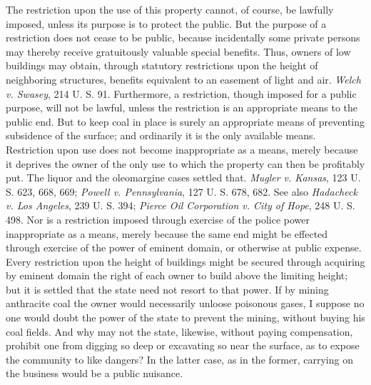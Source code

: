 The restriction upon the use of this property cannot, of course, be lawfully
imposed, unless its purpose is to protect the public. But the purpose of a
restriction does not cease to be public, because incidentally some private
persons may thereby receive gratuitously valuable special benefits. Thus, owners
of low buildings may obtain, through statutory restrictions upon the height of
neighboring structures, benefits equivalent to an easement of light and air.
\emph{Welch v. Swasey}, 214 U. S. 91. Furthermore, a restriction, though imposed
for a public purpose, will not be lawful, unless the restriction is an
appropriate means to the public end. But to keep coal in place is surely an
appropriate means of preventing subsidence of the surface; and ordinarily it is
the only available means. Restriction upon use does not become inappropriate as
a means, merely because it deprives the owner of the only use to which the
property can then be profitably put. The liquor and the oleomargine cases
settled that. \emph{Mugler v. Kansas}, 123 U. S. 623, 668, 669; \emph{Powell v.
Pennsylvania}, 127 U. S. 678, 682. See also \emph{Hadacheck v. Los Angeles}, 239
U. S. 394; \emph{Pierce Oil Corporation v. City of Hope}, 248 U. S. 498. Nor is
a restriction imposed through exercise of the police power inappropriate as a
means, merely because the same end might be effected through exercise of the
power of eminent domain, or otherwise at public expense. Every restriction upon
the height of buildings might be secured through acquiring by eminent domain the
right of each owner to build above the limiting height; but it is settled that
the state need not resort to that power. If by mining anthracite coal the owner
would necessarily unloose poisonous gases, I suppose no one would doubt the
power of the state to prevent the mining, without buying his coal fields. And
why may not the state, likewise, without paying compensation, prohibit one from
digging so deep or excavating so near the surface, as to expose the community to
like dangers? In the latter case, as in the former, carrying on the business
would be a public nuisance.

